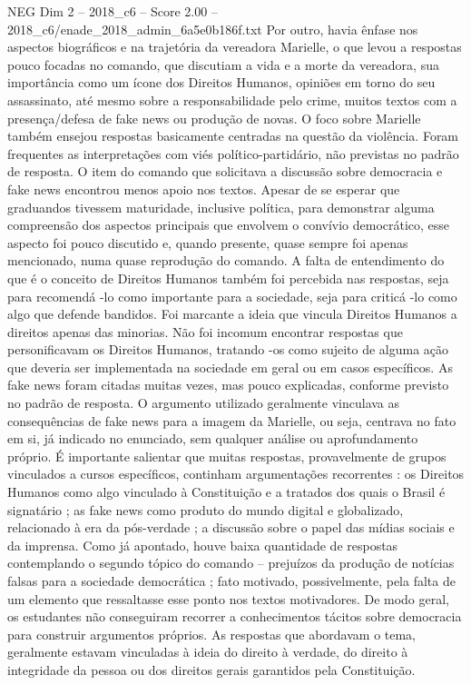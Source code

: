 \begin{textsample}{NEG Dim 2 – 2018\_c6 – Score 2.00 – 2018\_c6/enade\_2018\_admin\_6a5e0b186f.txt}
Por outro, havia ênfase nos aspectos biográficos e na trajetória da vereadora Marielle, o que levou a respostas pouco focadas no comando, que discutiam a vida e a morte da vereadora, sua importância como um ícone dos Direitos Humanos, opiniões em torno do seu assassinato, até mesmo sobre a responsabilidade pelo crime, muitos textos com a presença/defesa de fake news ou produção de novas.
O foco sobre Marielle também ensejou respostas basicamente centradas na questão da violência.
Foram frequentes as interpretações com viés político-partidário, não previstas no padrão de resposta.
O item do comando que solicitava a discussão sobre democracia e fake news encontrou menos apoio nos textos.
Apesar de se esperar que graduandos tivessem maturidade, inclusive política, para demonstrar alguma compreensão dos aspectos principais que envolvem o convívio democrático, esse aspecto foi pouco discutido e, quando presente, quase sempre foi apenas mencionado, numa quase reprodução do comando.
A falta de entendimento do que é o conceito de Direitos Humanos também foi percebida nas respostas, seja para recomendá -lo como importante para a sociedade, seja para criticá -lo como algo que defende bandidos.
Foi marcante a ideia que vincula Direitos Humanos a direitos apenas das minorias.
Não foi incomum encontrar respostas que personificavam os Direitos Humanos, tratando -os como sujeito de alguma ação que deveria ser implementada na sociedade em geral ou em casos específicos.
As fake news foram citadas muitas vezes, mas pouco explicadas, conforme previsto no padrão de resposta.
O argumento utilizado geralmente vinculava as consequências de fake news para a imagem da Marielle, ou seja, centrava no fato em si, já indicado no enunciado, sem qualquer análise ou aprofundamento próprio.
É importante salientar que muitas respostas, provavelmente de grupos vinculados a cursos específicos, continham argumentações recorrentes : os Direitos Humanos como algo vinculado à Constituição e a tratados dos quais o Brasil é signatário ; as fake news como produto do mundo digital e globalizado, relacionado à era da pós-verdade ; a discussão sobre o papel das mídias sociais e da imprensa.
Como já apontado, houve baixa quantidade de respostas contemplando o segundo tópico do comando – prejuízos da produção de notícias falsas para a sociedade democrática ; fato motivado, possivelmente, pela falta de um elemento que ressaltasse esse ponto nos textos motivadores.
De modo geral, os estudantes não conseguiram recorrer a conhecimentos tácitos sobre democracia para construir argumentos próprios.
As respostas que abordavam o tema, geralmente estavam vinculadas à ideia do direito à verdade, do direito à integridade da pessoa ou dos direitos gerais garantidos pela Constituição.

\end{textsample}
